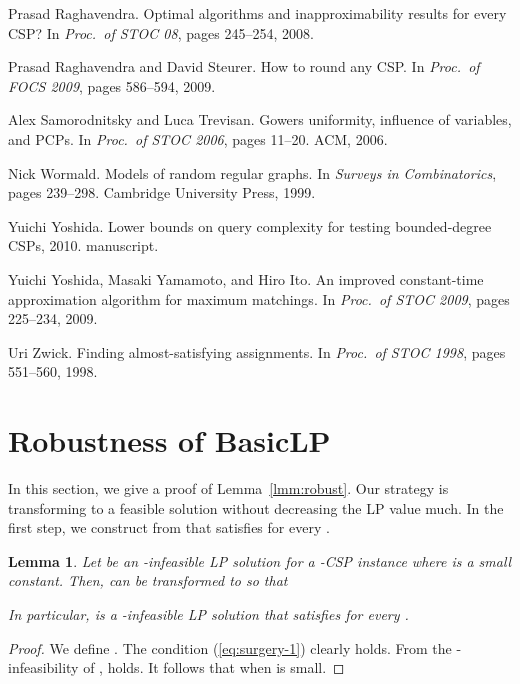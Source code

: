 \documentclass[letterpaper, 11pt]{article}
\newtheorem{lemma}[theorem]{Lemma}
\newcommand{\blp}{\textsf{BasicLP}\xspace}
\begin{document}
\begin{thebibliography}{10}
Prasad Raghavendra.
\newblock Optimal algorithms and inapproximability results for every {CSP}?
\newblock In {\em Proc.~of STOC 08}, pages 245--254, 2008.

Prasad Raghavendra and David Steurer.
\newblock How to round any {CSP}.
\newblock In {\em Proc.~of FOCS 2009}, pages 586--594, 2009.

Alex Samorodnitsky and Luca Trevisan.
\newblock Gowers uniformity, influence of variables, and {PCPs}.
\newblock In {\em Proc.~of STOC 2006}, pages 11--20. ACM, 2006.

Nick Wormald.
\newblock Models of random regular graphs.
\newblock In {\em Surveys in Combinatorics}, pages 239--298. Cambridge
  University Press, 1999.

Yuichi Yoshida.
\newblock Lower bounds on query complexity for testing bounded-degree {CSPs},
  2010.
\newblock manuscript.

Yuichi Yoshida, Masaki Yamamoto, and Hiro Ito.
\newblock An improved constant-time approximation algorithm for maximum
  matchings.
\newblock In {\em Proc.~of STOC 2009}, pages 225--234, 2009.

Uri Zwick.
\newblock Finding almost-satisfying assignments.
\newblock In {\em Proc.~of STOC 1998}, pages 551--560, 1998.

\end{thebibliography}

\newpage

\appendix
\noindent {\bf\Large \appendixname}

\section{Robustness of \blp}\label{apx:robust}
In this section, we give a proof of Lemma~\ref{lmm:robust}.
Our strategy is transforming  to a feasible solution without decreasing the LP value much.
In the first step,
we construct  from  that satisfies  for every .
\begin{lemma}\label{lmm:surgery}
  Let  be an -infeasible LP solution for a -CSP instance  where  is a small constant.
  Then,  can be transformed to  so that
  
  In particular, 
   is a -infeasible LP solution that satisfies  for every .
\end{lemma}
\begin{proof}
  We define .
  The condition (\ref{eq:surgery-1}) clearly holds.
  From the -infeasibility of , 
   holds.
  It follows that  when  is small.
\end{proof}
\end{document}

